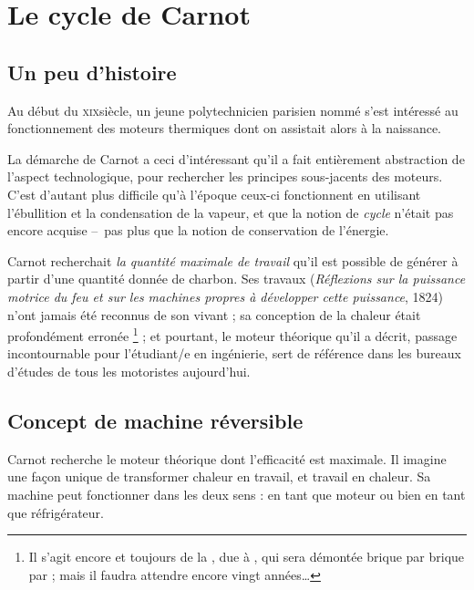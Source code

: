 \section{Le cycle de Carnot}
\label{ch_cycle_de_carnot}



	\subsection{Un peu d’histoire}

		Au début du \textsc{xix}\ieme siècle, un jeune polytechnicien parisien nommé  s’est intéressé au fonctionnement des moteurs thermiques dont on assistait alors à la naissance.

		La démarche de Carnot a ceci d’intéressant qu’il a fait entièrement abstraction de l’aspect technologique, pour rechercher les principes sous-jacents des moteurs. C’est d’autant plus difficile qu’à l’époque ceux-ci fonctionnent en utilisant l’ébullition et la condensation de la vapeur, et que la notion de \emph{cycle} n’était pas encore acquise --\ pas plus que la notion de conservation de l’énergie.

		Carnot recherchait \emph{la quantité maximale de travail} qu’il est possible de générer à partir d’une quantité donnée de charbon. Ses travaux (\textit{Réflexions sur la puissance motrice du feu et sur les machines propres à développer cette puissance}, 1824) n’ont jamais été reconnus de son vivant ; sa conception de la chaleur était profondément erronée%
			\footnote{Il s’agit encore et toujours de la , due à , qui sera démontée brique par brique par  ; mais il faudra attendre encore vingt années…}%
		 ; et pourtant, le moteur théorique qu’il a décrit, passage incontournable pour l’étudiant/e en ingénierie, sert de référence dans les bureaux d’études de tous les motoristes aujourd’hui.



	\subsection{Concept de machine réversible}

		Carnot recherche le moteur théorique dont l’efficacité est maximale. Il imagine une façon unique de transformer chaleur en travail, et travail en chaleur. Sa machine peut fonctionner dans les deux sens : en tant que moteur ou bien en tant que réfrigérateur.

